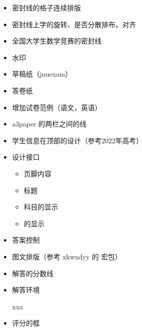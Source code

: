 \documentclass{ccnudoc}
\begin{document}
\begin{itemize}
  \item 密封线的格子连续排版
  \item 密封线上字的旋转、是否分散排布，对齐
  \item 全国大学生数学竞赛的密封线
  \item 水印
  \item 草稿纸（jnuexam）
  \item 答卷纸
  \item 增加试卷范例（语文，英语）
  \item a3paper 的两栏之间的线
    \begin{latexexample}[gobble = 6]
      \setlength{\columnseprule}{0.4pt}
    \end{latexexample}
  \item 学生信息在顶部的设计（参考2022年高考）
  \item 设计接口
    \begin{itemize}
      \item 页脚内容
      \item 标题
      \item 科目的显示
      \item {} 的显示
    \end{itemize}
  \item 答案控制
  \item 图文排版（参考 xkwxdyy 的  宏包）
  \item 解答的分数线
  \item 解答环境
    \begin{latexexample}[gobble = 6]
      \begin{solution}
        xxx
      \end{solution}

    \end{latexexample}
  \item 评分的框
\end{itemize}

\end{document}
